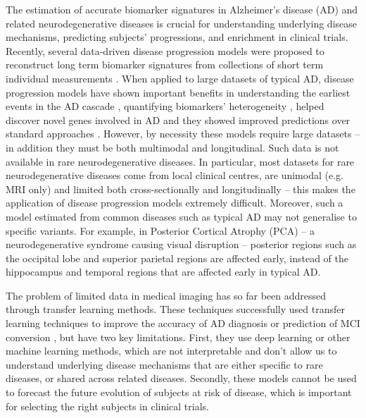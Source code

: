 \documentclass{llncs}
\begin{document}
The estimation of accurate biomarker signatures in Alzheimer's disease (AD) and related neurodegenerative diseases is crucial for understanding underlying disease mechanisms, predicting subjects' progressions, and enrichment in clinical trials. Recently, several data-driven disease progression models were proposed to reconstruct long term biomarker signatures from collections of short term individual measurements \cite{lorenzi2017disease,oxtoby2018}. When applied to large datasets of typical AD, disease progression models have shown important benefits in understanding the earliest events in the AD cascade \cite{iturria2016early}, quantifying biomarkers' heterogeneity \cite{young2018uncovering}, helped discover novel genes involved in AD \cite{scelsi2018genetic} and they showed improved predictions over standard approaches \cite{oxtoby2018}. However, by necessity these models require large datasets -- in addition they must be both multimodal and longitudinal. Such data is not available in rare neurodegenerative diseases. In particular, most datasets for rare neurodegenerative diseases come from local clinical centres, are unimodal (e.g. MRI only) and limited both cross-sectionally and longitudinally -- this makes the application of disease progression models extremely difficult.  Moreover, such a model estimated from common diseases such as typical AD may not generalise to specific variants. For example, in Posterior Cortical Atrophy (PCA) -- a neurodegenerative syndrome causing visual disruption -- posterior regions such as the occipital lobe and superior parietal regions are affected early, instead of the hippocampus and temporal regions that are affected early in typical AD. 

The problem of limited data in medical imaging has so far been addressed through transfer learning methods. These techniques successfully used transfer learning techniques to improve the accuracy of AD diagnosis \cite{hon2017towards} or prediction of MCI conversion \cite{cheng2015domain}, but have two key limitations. First, they use deep learning or other machine learning methods, which are not interpretable and don't allow us to understand underlying disease mechanisms that are either specific to rare diseases, or shared across related diseases. Secondly, these models cannot be used to forecast the future evolution of subjects at risk of disease, which is important for selecting the right subjects in clinical trials. 
\end{document}
